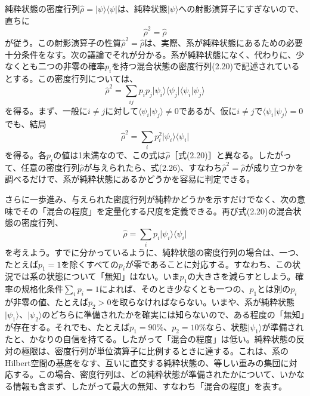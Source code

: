 純粋状態の密度行列$\hat\rho=\lvert\psi\rangle\langle\psi\rvert$は、純粋状態$\lvert\psi\rangle$への射影演算子にすぎないので、直ちに
\begin{equation}\hat\rho^2=\hat\rho\tag{2.26}\end{equation}
が従う。この射影演算子の性質$\hat\rho^2=\hat\rho$は、実際、系が純粋状態にあるための必要十分条件をなす。次の議論でそれが分かる。系が純粋状態になく、代わりに、少なくとも二つの非零の確率$p_i$を持つ混合状態の密度行列(2.20)で記述されているとする。この密度行列については、
\hypertarget{srcpage:40}{}\label{srcpage:40}
\begin{equation}\hat\rho^2=\sum_{ij}p_ip_j\lvert\psi_i\rangle\langle\psi_j\rvert\langle\psi_i\vert\psi_j\rangle\tag{2.27}\end{equation}
を得る。まず、一般に$i\ne j$に対して$\langle\psi_i\vert\psi_j\rangle\ne0$であるが、仮に$i\ne j$で$\langle\psi_i\vert\psi_j\rangle=0$でも、結局
\begin{equation}\hat\rho^2=\sum_i p_i^2\lvert\psi_i\rangle\langle\psi_i\rvert\tag{2.28}\end{equation}
を得る。各$p_i$の値は1未満なので、この式は$\hat\rho$［式(2.20)］と異なる。したがって、任意の密度行列$\hat\rho$が与えられたら、式(2.26)、すなわち$\hat\rho^2=\hat\rho$が成り立つかを調べるだけで、系が純粋状態にあるかどうかを容易に判定できる。

さらに一歩進み、与えられた密度行列が純粋かどうかを示すだけでなく、次の意味でその「混合の程度」を定量化する尺度を定義できる。再び式(2.20)の混合状態の密度行列、
\begin{equation}\hat\rho=\sum_i p_i\lvert\psi_i\rangle\langle\psi_i\rvert\tag{2.29}\end{equation}
を考えよう。すでに分かっているように、純粋状態の密度行列の場合は、一つ、たとえば$p_1=1$を除くすべての$p_i$が零であることに対応する。すなわち、この状況では系の状態について「無知」はない。いま$p_1$の大きさを減らすとしよう。確率の規格化条件$\sum_i p_i=1$によれば、そのとき少なくとも一つの、$p_1$とは別の$p_i$が非零の値、たとえば$p_2>0$を取らなければならない。いまや、系が純粋状態$\lvert\psi_1\rangle$、$\lvert\psi_2\rangle$のどちらに準備されたかを確実には知らないので、ある程度の「無知」が存在する。それでも、たとえば$p_1=90\%$、$p_2=10\%$なら、状態$\lvert\psi_1\rangle$が準備されたと、かなりの自信を持てる。したがって「混合の程度」は低い。純粋状態の反対の極限は、密度行列が単位演算子に比例するときに達する。これは、系のHilbert空間の基底をなす、互いに直交する純粋状態の、等しい重みの集団に対応する。この場合、密度行列は、どの純粋状態が準備されたかについて、いかなる情報も含まず、したがって最大の無知、すなわち「混合の程度」を表す。

